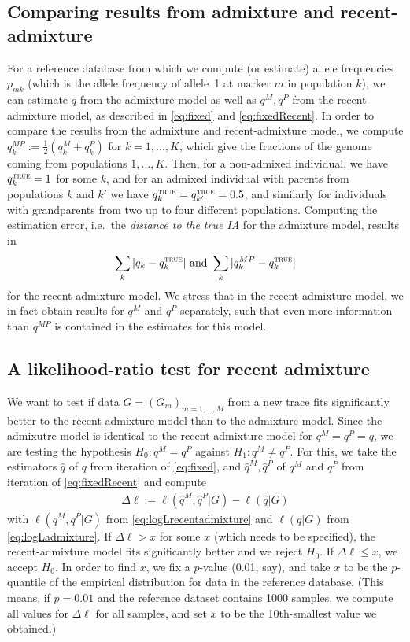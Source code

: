 \documentclass[12pt]{article}
\theoremstyle{definition}
\begin{document}
\subsection{Comparing results from admixture and recent-admixture}
For a reference database from which we compute (or estimate) allele
frequencies $p_{mk}$ (which is the allele frequency of allele~1 at
marker $m$ in population $k$), we can estimate $q$ from the admixture
model as well as $q^M,q^P$ from the recent-admixture model, as
described in \eqref{eq:fixed} and \eqref{eq:fixedRecent}. In order to
compare the results from the admixture and recent-admixture model, we
compute $q_k^{MP} := \tfrac 12 (q_k^M + q_k^P)$ for $k=1,...,K$, which
give the fractions of the genome coming from populations
$1,...,K$. Then, for a non-admixed individual, we have
$q_k^{\text{\sc true}} = 1$ for some $k$, and for an admixed
individual with parents from populations $k$ and $k'$ we have
$q_k^{\text{\sc true}} =q_{k'}^{\text{\sc true}} = 0.5$, and similarly
for individuals with grandparents from two up to four different
populations. Computing the estimation error, i.e.\ the {\em distance
  to the true IA} for the admixture model, results in
\begin{align}
  \label{eq:error}
  \sum_k |q_k - q_k^{\text{\sc true}}| \text{  and }\sum_k |q_k^{MP} - q_k^{\text{\sc true}}|
\end{align}
for the recent-admixture model. We stress that in the recent-admixture
model, we in fact obtain results for $q^M$ and $q^P$ separately, such
that even more information than $q^{MP}$ is contained in the estimates
for this model.

\subsection{A likelihood-ratio test for recent admixture}
We want to test if data $G = (G_m)_{m=1,...,M}$ from a new trace fits
significantly better to the recent-admixture model than to the
admixture model. Since the admixutre model is identical to the
recent-admixture model for $q^M = q^P = q$, we are testing the
hypothesis $H_0: q^M = q^P$ against $H_1: q^M\neq q^P$. For this, we
take the estimators $\hat q$ of $q$ from iteration of
\eqref{eq:fixed}, and $\hat q^M, \hat q^P$ of $q^M$ and $q^P$ from
iteration of \eqref{eq:fixedRecent} and compute
\begin{align}
  \label{eq:DeltaEll}
  \Delta\ell := \ell(\hat q^M, \hat q^P|G) - \ell(\hat q|G)
\end{align}
with
$\ell(q^M, q^P|G)$ from \eqref{eq:logLrecentadmixture} and $\ell(q|G)$
from \eqref{eq:logLadmixture}. If $\Delta \ell >x$ for some $x$ (which
needs to be specified), the recent-admixture model fits significantly
better and we reject $H_0$. If $\Delta \ell \leq x$, we accept
$H_0$. In order to find $x$, we fix a $p$-value (0.01, say), and take
$x$ to be the $p$-quantile of the empirical distribution for data in
the reference database. (This means, if $p=0.01$ and the reference
dataset contains 1000 samples, we compute all values for $\Delta\ell$
for all samples, and set $x$ to be the 10th-smallest value we
obtained.)
\end{document}
